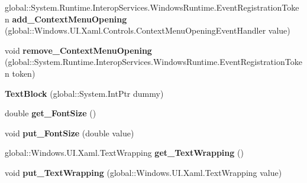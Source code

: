 \begin{DoxyCompactItemize}
\mbox{\label{class_windows_1_1_u_i_1_1_xaml_1_1_controls_1_1_text_block_abe06af10f87317e305ba6d841b08607c}} 
global\+::\+System.\+Runtime.\+Interop\+Services.\+Windows\+Runtime.\+Event\+Registration\+Token {\bfseries add\+\_\+\+Context\+Menu\+Opening} (global\+::\+Windows.\+U\+I.\+Xaml.\+Controls.\+Context\+Menu\+Opening\+Event\+Handler value)
\item 
\mbox{\label{class_windows_1_1_u_i_1_1_xaml_1_1_controls_1_1_text_block_ac298be0da72f4c9f2a436c5949a660d7}} 
void {\bfseries remove\+\_\+\+Context\+Menu\+Opening} (global\+::\+System.\+Runtime.\+Interop\+Services.\+Windows\+Runtime.\+Event\+Registration\+Token token)
\item 
\mbox{\label{class_windows_1_1_u_i_1_1_xaml_1_1_controls_1_1_text_block_a626ff976bc29fd838fa655f97f2533b0}} 
{\bfseries Text\+Block} (global\+::\+System.\+Int\+Ptr dummy)
\item 
\mbox{\label{class_windows_1_1_u_i_1_1_xaml_1_1_controls_1_1_text_block_ae396cab368662cf3d314b4c8cf21d51b}} 
double {\bfseries get\+\_\+\+Font\+Size} ()
\item 
\mbox{\label{class_windows_1_1_u_i_1_1_xaml_1_1_controls_1_1_text_block_a610333d337bf2e0cf5c901ca88ce3a21}} 
void {\bfseries put\+\_\+\+Font\+Size} (double value)
\item 
\mbox{\label{class_windows_1_1_u_i_1_1_xaml_1_1_controls_1_1_text_block_a7e6fe2e6c2baed541c6ec98293bfde3e}} 
global\+::\+Windows.\+U\+I.\+Xaml.\+Text\+Wrapping {\bfseries get\+\_\+\+Text\+Wrapping} ()
\item 
\mbox{\label{class_windows_1_1_u_i_1_1_xaml_1_1_controls_1_1_text_block_ac924a5e979a26efc36bd609cb83b92d7}} 
void {\bfseries put\+\_\+\+Text\+Wrapping} (global\+::\+Windows.\+U\+I.\+Xaml.\+Text\+Wrapping value)
\item 
\mbox{\label{class_windows_1_1_u_i_1_1_xaml_1_1_controls_1_1_text_block_ac6b29ca491dedd9ebb342072b1916a79}} 

\end{DoxyCompactItemize}
